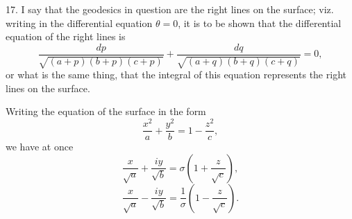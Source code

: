 \documentclass[11pt,a4paper]{article}
\begin{document}
17. I say that the geodesics in question are the right lines on the surface; viz.
writing in the differential equation \(\theta=0\), it is to be shown that the differential
equation of the right lines is
\[
\frac{dp}{\sqrt{(a+p)(b+p)(c+p)}}+
\frac{dq}{\sqrt{(a+q)(b+q)(c+q)}}=0,
\]
or what is the same thing, that the integral of this equation represents the right
lines on the surface.

Writing the equation of the surface in the form
\[
\frac{x^2}{a}+\frac{y^2}{b}=1-\frac{z^2}{c},
\]
we have at once
\[
\frac{x}{\sqrt a}+\frac{iy}{\sqrt b}=
\sigma\left(1+\frac{z}{\sqrt c}\right),
\]
\[
\frac{x}{\sqrt a}-\frac{iy}{\sqrt b}=
\frac1\sigma\left(1-\frac{z}{\sqrt c}\right).
\]
\end{document}
